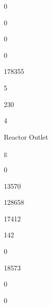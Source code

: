 \documentclass[a4paper,portrait,12pt]{article}
\begin{document}
0





0





0





0





178355





5





230





4





\begin{flushleft}
Reactor Outlet
\end{flushleft}





\begin{flushleft}
g
\end{flushleft}





0





13570





128658





17412





142





0





18573





0





0
\end{document}
